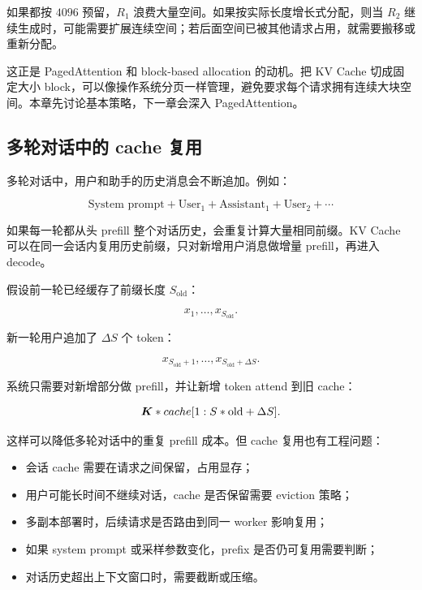 如果都按 $4096$ 预留，$R_1$ 浪费大量空间。如果按实际长度增长式分配，则当 $R_2$ 继续生成时，可能需要扩展连续空间；若后面空间已被其他请求占用，就需要搬移或重新分配。

这正是 PagedAttention 和 block-based allocation 的动机。把 KV Cache 切成固定大小 block，可以像操作系统分页一样管理，避免要求每个请求拥有连续大块空间。本章先讨论基本策略，下一章会深入 PagedAttention。

\subsection{多轮对话中的 cache 复用}
\label{subsec:multi-turn-cache-reuse}

多轮对话中，用户和助手的历史消息会不断追加。例如：

\[
\text{System prompt}
+
\text{User}_1
+
\text{Assistant}_1
+
\text{User}_2
+
\cdots
\]

如果每一轮都从头 prefill 整个对话历史，会重复计算大量相同前缀。KV Cache 可以在同一会话内复用历史前缀，只对新增用户消息做增量 prefill，再进入 decode。

假设前一轮已经缓存了前缀长度 $S_{\mathrm{old}}$：

\[
x_1,\ldots,x_{S_{\mathrm{old}}}.
\]

新一轮用户追加了 $\Delta S$ 个 token：

\[
x_{S_{\mathrm{old}}+1},\ldots,x_{S_{\mathrm{old}}+\Delta S}.
\]

系统只需要对新增部分做 prefill，并让新增 token attend 到旧 cache：

\[
\bm{K}*{cache}[1:S*{\mathrm{old}}+\Delta S].
\]

这样可以降低多轮对话中的重复 prefill 成本。但 cache 复用也有工程问题：

\begin{itemize}
\item 会话 cache 需要在请求之间保留，占用显存；
\item 用户可能长时间不继续对话，cache 是否保留需要 eviction 策略；
\item 多副本部署时，后续请求是否路由到同一 worker 影响复用；
\item 如果 system prompt 或采样参数变化，prefix 是否仍可复用需要判断；
\item 对话历史超出上下文窗口时，需要截断或压缩。
\end{itemize}

